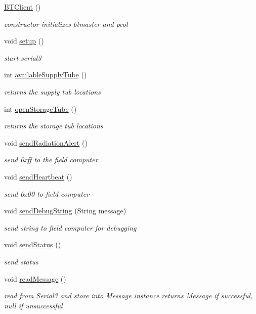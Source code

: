 \begin{DoxyCompactItemize}
\item 
\hyperlink{classBTClient_a60dc22e0906a1cea7a88813bb6d98f96}{B\-T\-Client} ()
\begin{DoxyCompactList}\small\item\em constructor initializes btmaster and pcol \end{DoxyCompactList}\item 
void \hyperlink{classBTClient_aefdc156fe1f22455d249ec0bb7fa3fd5}{setup} ()
\begin{DoxyCompactList}\small\item\em start serial3 \end{DoxyCompactList}\item 
int \hyperlink{classBTClient_a67250c48f81fee2b7c9f26d100c26799}{available\-Supply\-Tube} ()
\begin{DoxyCompactList}\small\item\em returns the supply tub locations \end{DoxyCompactList}\item 
int \hyperlink{classBTClient_a18e2223a0605a0ee67b5d004890b38c4}{open\-Storage\-Tube} ()
\begin{DoxyCompactList}\small\item\em returns the storage tub locations \end{DoxyCompactList}\item 
void \hyperlink{classBTClient_a70cc30b8de8632bd6fb81972a9409a10}{send\-Radiation\-Alert} ()
\begin{DoxyCompactList}\small\item\em send 0xff to the field computer \end{DoxyCompactList}\item 
void \hyperlink{classBTClient_a4bf8f58f2c83834cab585e69c55c171f}{send\-Heartbeat} ()
\begin{DoxyCompactList}\small\item\em send 0x00 to field computer \end{DoxyCompactList}\item 
void \hyperlink{classBTClient_a57a82b64a1233a66450c1d9ebe48774c}{send\-Debug\-String} (String message)
\begin{DoxyCompactList}\small\item\em send string to field computer for debugging \end{DoxyCompactList}\item 
void \hyperlink{classBTClient_a8820e63eebe5ab16fac9b7cb522fc55a}{send\-Status} ()
\begin{DoxyCompactList}\small\item\em send status \end{DoxyCompactList}\item 
void \hyperlink{classBTClient_a8e827d16926d45a4b7c18dda0e59837b}{read\-Message} ()
\begin{DoxyCompactList}\small\item\em read from Serial3 and store into Message instance returns Message if successful, null if unsuccessful \end{DoxyCompactList}\end{DoxyCompactItemize}

